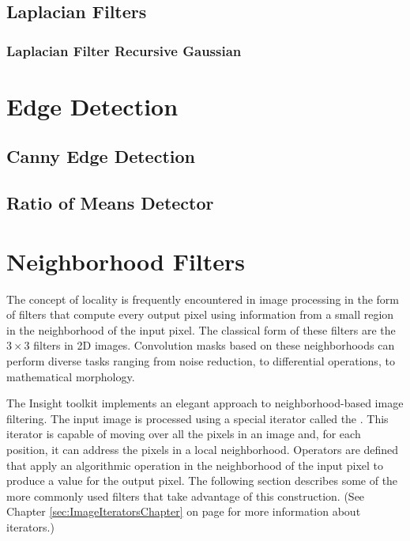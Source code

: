 \subsection{Laplacian Filters}
\label{sec:LaplacianFilters}

\subsubsection{Laplacian Filter Recursive Gaussian}
\ifitkFullVersion


\fi




\section{Edge Detection}

\subsection{Canny Edge Detection}
\ifitkFullVersion

\fi

\subsection{Ratio of Means Detector}




\section{Neighborhood Filters}
\label{sec:NeighborhoodFilters}

The concept of locality is frequently encountered in image processing in the
form of filters that compute every output pixel using information from a small
region in the neighborhood of the input pixel.  The classical form of
these filters are the $3 \times 3$ filters in 2D images. Convolution masks
based on these neighborhoods can perform diverse tasks ranging from noise
reduction, to differential operations, to mathematical morphology.

The Insight toolkit implements an elegant approach to neighborhood-based image
filtering.  The input image is processed using a special iterator called the
. This iterator is capable of moving over all the
pixels in an image and, for each position, it can address the pixels in a local
neighborhood. Operators are defined that apply an algorithmic operation in the
neighborhood of the input pixel to produce a value for the output pixel.  The
following section describes some of the more commonly used filters that take
advantage of this construction. (See Chapter
\ref{sec:ImageIteratorsChapter} on page
\pageref{sec:ImageIteratorsChapter} for more information about iterators.)

